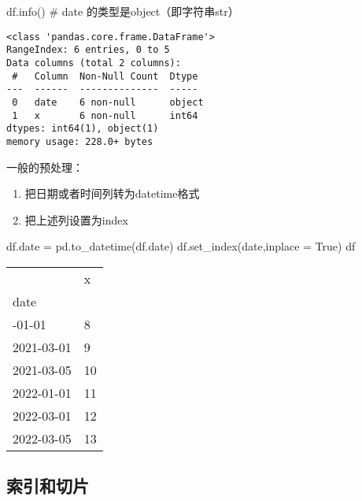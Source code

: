 \documentclass[
  letterpaper,
  DIV=11,
  numbers=noendperiod]{scrreprt}
\newenvironment{Shaded}{\begin{snugshade}}{\end{snugshade}}
\newcommand{\CommentTok}[1]{\textcolor[rgb]{0.37,0.37,0.37}{#1}}
\newcommand{\NormalTok}[1]{\textcolor[rgb]{0.00,0.23,0.31}{#1}}
\newcommand{\OperatorTok}[1]{\textcolor[rgb]{0.37,0.37,0.37}{#1}}
\newcommand{\StringTok}[1]{\textcolor[rgb]{0.13,0.47,0.30}{#1}}
\newcommand{\VariableTok}[1]{\textcolor[rgb]{0.07,0.07,0.07}{#1}}
\providecommand{\tightlist}{%
  \setlength{\itemsep}{0pt}\setlength{\parskip}{0pt}}\usepackage{longtable,booktabs,array}
\begin{document}
\begin{Shaded}
\begin{Highlighting}[]
\NormalTok{df.info() }\CommentTok{\# date 的类型是object（即字符串str）}
\end{Highlighting}
\end{Shaded}

\begin{verbatim}
<class 'pandas.core.frame.DataFrame'>
RangeIndex: 6 entries, 0 to 5
Data columns (total 2 columns):
 #   Column  Non-Null Count  Dtype 
---  ------  --------------  ----- 
 0   date    6 non-null      object
 1   x       6 non-null      int64 
dtypes: int64(1), object(1)
memory usage: 228.0+ bytes
\end{verbatim}

一般的预处理：

\begin{enumerate}
\def\labelenumi{\arabic{enumi}.}
\tightlist
\item
  把日期或者时间列转为datetime格式
\item
  把上述列设置为index
\end{enumerate}

\begin{Shaded}
\begin{Highlighting}[]
\NormalTok{df.date }\OperatorTok{=}\NormalTok{ pd.to\_datetime(df.date)}
\NormalTok{df.set\_index(}\StringTok{\textquotesingle{}date\textquotesingle{}}\NormalTok{,inplace }\OperatorTok{=} \VariableTok{True}\NormalTok{)}
\NormalTok{df}
\end{Highlighting}
\end{Shaded}

\begin{longtable}[]{@{}ll@{}}
\toprule\noalign{}
& x \\
date & \\
\midrule\noalign{}
\endhead
\bottomrule\noalign{}
\endlastfoot
2021-01-01 & 8 \\
2021-03-01 & 9 \\
2021-03-05 & 10 \\
2022-01-01 & 11 \\
2022-03-01 & 12 \\
2022-03-05 & 13 \\
\end{longtable}

\hypertarget{ux7d22ux5f15ux548cux5207ux7247}{%
\subsection{索引和切片}\label{ux7d22ux5f15ux548cux5207ux7247}}
\end{document}
